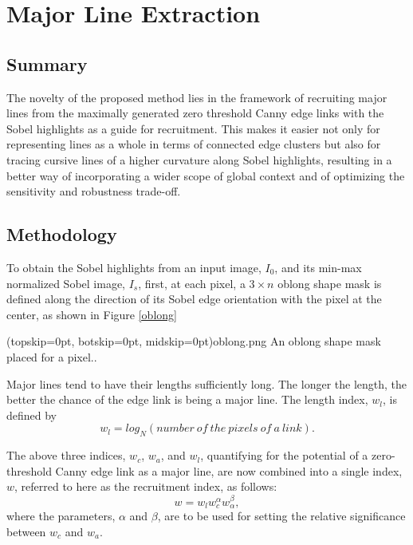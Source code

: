 \documentclass{ieeeaccess}
\begin{document}
\section{Major Line Extraction}
\label{sec:introduction}
\subsection{Summary}
The novelty of the proposed method lies in the framework
of recruiting major lines from the maximally generated zero
threshold Canny edge links with the Sobel highlights as a guide
for recruitment. This makes it easier not only for representing
lines as a whole in terms of connected edge clusters but also
for tracing cursive lines of a higher curvature along Sobel highlights, resulting in a better way of incorporating a wider scope of
global context and of optimizing the sensitivity and robustness
trade-off.

\subsection{Methodology}
To obtain the Sobel highlights from
an input image, $I_0$, and its min-max normalized Sobel image, $I_s$,
first, at each pixel, a $3\times n$ oblong shape mask is defined along the
direction of its Sobel edge orientation with the pixel at the center,
as shown in Figure \ref{oblong}

\Figure[t!](topskip=0pt, botskip=0pt, midskip=0pt){oblong.png}
{An oblong shape mask placed for a pixel.\label{oblong}}.

Major lines tend
to have their lengths sufficiently long. The longer the length,
the better the chance of the edge link is being a major line. The
length index, $w_l$, is defined by
\begin{equation}
w_l=log_N(number\ of\ the\ pixels\ of\ a\ link).
\end{equation}

The above three indices, $w_c$, $w_a$, and $w_l$, quantifying for the
potential of a zero-threshold Canny edge link as a major line,
are now combined into a single index, $w$, referred to here as the
recruitment index, as follows:
\begin{equation}
w=w_{l}w_{c}^{\alpha}w_{\alpha}^{\beta},
\end{equation}
where the parameters, $\alpha$ and $\beta$, are to be used for setting the
relative significance between $w_c$ and $w_a$.
\end{document}
